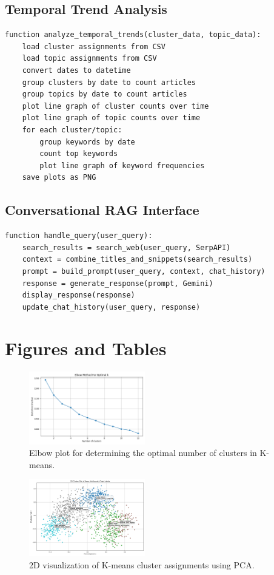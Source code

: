 \documentclass[conference]{IEEEtran}
\begin{document}
\subsection{Temporal Trend Analysis}
\begin{lstlisting}
function analyze_temporal_trends(cluster_data, topic_data):
    load cluster assignments from CSV
    load topic assignments from CSV
    convert dates to datetime
    group clusters by date to count articles
    group topics by date to count articles
    plot line graph of cluster counts over time
    plot line graph of topic counts over time
    for each cluster/topic:
        group keywords by date
        count top keywords
        plot line graph of keyword frequencies
    save plots as PNG
\end{lstlisting}

\subsection{Conversational RAG Interface}
\begin{lstlisting}
function handle_query(user_query):
    search_results = search_web(user_query, SerpAPI)
    context = combine_titles_and_snippets(search_results)
    prompt = build_prompt(user_query, context, chat_history)
    response = generate_response(prompt, Gemini)
    display_response(response)
    update_chat_history(user_query, response)
\end{lstlisting}

\section{Figures and Tables}\label{sec:figures-tables}
\begin{figure}[t]
    \centering
    \includegraphics[width=0.45\textwidth]{elbow_plot.png}
    \caption{Elbow plot for determining the optimal number of clusters in K-means.}
    \label{fig:elbow-plot}
\end{figure}

\begin{figure}[t]
    \centering
    \includegraphics[width=0.45\textwidth]{cluster_plot.png}
    \caption{2D visualization of K-means cluster assignments using PCA.}
    \label{fig:cluster-plot}
\end{figure}
\end{document}
